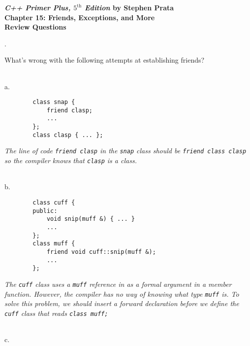 \documentclass{amsart}
\begin{document}
\begin{center}
	\Large {\bfseries
	\emph{C++ Primer Plus, $5^{\text{th}}$ Edition} by Stephen Prata \\
	Chapter 15: Friends, Exceptions, and More \\
	Review Questions} \normalsize \vspace{5ex}
\end{center}


\phantom{\quad}\vfill
{}. 
\begin{minipage}[t]{11.5 cm}
	What's wrong with the following attempts at establishing friends?
\end{minipage} \\[1ex]
\phantom{1. }a.
\begin{minipage}[t]{11.5 cm}
	\begin{verbatim}
		class snap {
		    friend clasp;
		    ...
		};
		class clasp { ... };
	\end{verbatim}	
	{\slshape 
		The line of code \verb+friend clasp+ in the \verb+snap+ class
		should be \verb+friend class clasp+ so the compiler knows that
		\verb+clasp+ is a class. 
	} \\
	{} %
\end{minipage} \\
\phantom{1. }b.
\begin{minipage}[t]{11.5 cm}
	\begin{verbatim}
		class cuff {
		public:
		    void snip(muff &) { ... }
		    ...
		};
		class muff {
		    friend void cuff::snip(muff &);
		    ...
		};
	\end{verbatim}
	{\slshape 
		The \verb+cuff+ class uses a \verb+muff+ reference in as a
		formal argument in a member function.
		However, the compiler has no way of knowing what type \verb+muff+
		is.
		To solve this problem, we should insert a forward declaration
		before we define the \verb+cuff+ class that reads
		\verb+class muff;+
	}\\
	{} %
\end{minipage} \\
\phantom{1. }c. 
\end{document}
